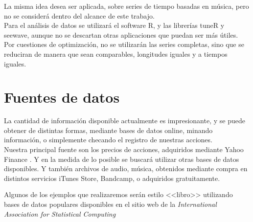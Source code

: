 \documentclass[12pt,oneside]{book}
\begin{document}
La misma idea desea ser aplicada, sobre series de tiempo basadas en m\'usica, pero no se consider\'a dentro del alcance de este trabajo.\\

Para el an\'alisis de datos se utilizar\'a el software R, y las librer\'ias tuneR y seewave, aunque no se descartan otras aplicaciones que puedan ser m\'as \'utiles. \\

Por cuestiones de optimizaci\'on, no se utilizar\'an las series completas, sino que se reduciran de manera que sean comparables, longitudes iguales y a tiempos iguales.
\section{Fuentes de datos} %
\label{sec:fuentes_de_datos}
La cantidad de informaci\'on disponible actualmente es impresionante, y se puede obtener de distintas formas, mediante bases de datos online, minando informaci\'on, o simplemente checando el registro de nuestras acciones. \\


Nuestra principal fuente son los precios de acciones, adquiridos mediante Yahoo Finance \textcopyright. Y en la medida de lo posible se buscar\'a utilizar otras bases de datos disponibles. Y tambi\'en archivos de audio, m\'usica, obtenidos mediante compra en distintos servicios iTunes Store\textcopyright, Bandcamp\textcopyright, o adquiridos gratuitamente.

Algunos de los ejemplos que realizaremos ser\'an estilo <<libro>> utilizando bases de datos populares disponibles en el sitio web de la \emph{International Association for Statistical Computing}
\end{document}
